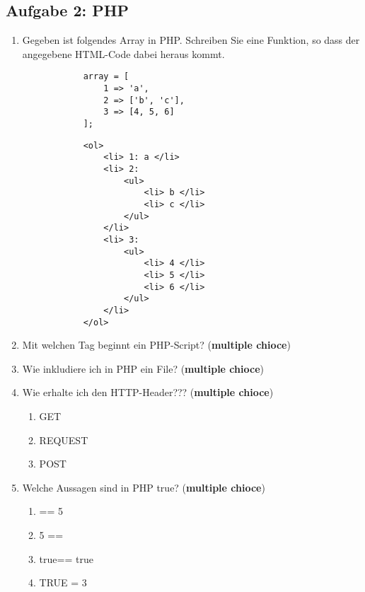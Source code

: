 \newpage
\subsection{Aufgabe 2: PHP}
\label{sec:Aufgabe2}
\begin{enumerate}[label=\alph*)]
    \item Gegeben ist folgendes Array in PHP. Schreiben Sie eine Funktion, so dass der angegebene HTML-Code dabei heraus kommt.
        \begin{verbatim}
            array = [
                1 => 'a',
                2 => ['b', 'c'],
                3 => [4, 5, 6]
            ];
        \end{verbatim}
    
        \begin{verbatim}
            <ol>
                <li> 1: a </li>
                <li> 2:
                    <ul>
                        <li> b </li>
                        <li> c </li>
                    </ul>
                </li>
                <li> 3:
                    <ul>
                        <li> 4 </li>
                        <li> 5 </li>
                        <li> 6 </li>
                    </ul>
                </li>
            </ol>
        \end{verbatim}
    \item Mit welchen Tag beginnt ein PHP-Script? (\textbf{multiple chioce})
    \item Wie inkludiere ich in PHP ein File? (\textbf{multiple chioce})
    \item Wie erhalte ich den HTTP-Header??? (\textbf{multiple chioce})
        \begin{enumerate}[label=\arabic*.]
            \item GET
            \item REQUEST
            \item POST
        \end{enumerate}
    \item Welche Aussagen sind in PHP true? (\textbf{multiple chioce})
        \begin{enumerate}[label=\arabic*.]
            \item {}\grqq == 5 
            \item 5 == \grqq
            \item \grqq true\grqq == \grqq true\grqq
            \item TRUE = 3
        \end{enumerate}
\end{enumerate}
